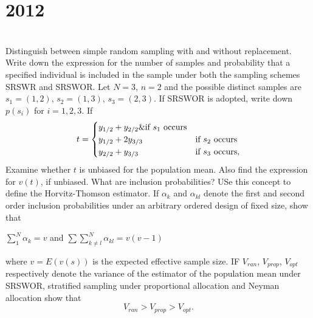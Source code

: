 \section*{2012}
\vspace{-.5cm}
\hrulefill \smallskip\\
 Distinguish between simple random sampling with and without replacement. Write down the expression for the number of samples and probability that a specified individual is included in the sample under both the sampling schemes SRSWR and SRSWOR.
\myline
{} Let $N=3$, $n =2$ and the possible distinct samples are $s_1=(1,2)$, $s_2=(1,3)$, $s_3=(2,3)$. If SRSWOR is adopted, write down $p(s_i)$ for $i =1,2,3$. If\[ t= \begin{cases} y_{1/2} + y_{2/2} \&\text{if $s_1$ occurs}\\
y_{1/2} + 2y_{3/3} \enskip &\text{if $s_2$ occurs}\\
y_{2/2} + y_{3/3} &\text{if $s_3$ occurs}, \end{cases}\] Examine whether $t$ is unbiased for the population mean. Also find the expression for $v(t)$, if unbiased.
\myline
{} What are inclusion probabilities? USe this concept to define the Horvitz-Thomson estimator. If $\alpha_k$ and $\alpha_{kl}$ denote the first and second order inclusion probabilities under an arbitrary ordered design of fixed size, show that \begin{tasks} \task $\displaystyle \sum_1^N\alpha_k = v$  and
\task $\displaystyle \sum\sum_{k\neq l}^N \alpha_{kl} = v(v-1)$
\end{tasks} where $v = E(v(s))$ is the expected effective sample size.
\myline
{} IF $V_{ran}$, $V_{prop}$, $V_{opt}$ respectively denote the variance of the estimator of the population mean under SRSWOR, stratified sampling under proportional allocation and Neyman allocation show that
\[ V_{ran} > V_{prop} > V_{opt} .\] 